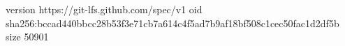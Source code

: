 version https://git-lfs.github.com/spec/v1
oid sha256:bccad440bbcc28b53f3e71cb7a614c4f5ad7b9af18bf508c1cec50fac1d2df5b
size 50901
